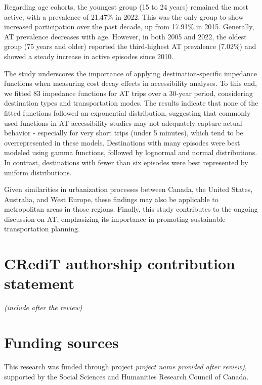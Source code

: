 \documentclass[preprint, 3p,
authoryear]{elsarticle} %
\begin{document}
Regarding age cohorts, the youngest group (15 to 24 years) remained the
most active, with a prevalence of 21.47\% in 2022. This was the only
group to show increased participation over the past decade, up from
17.91\% in 2015. Generally, AT prevalence decreases with age. However,
in both 2005 and 2022, the oldest group (75 years and older) reported
the third-highest AT prevalence (7.02\%) and showed a steady increase in
active episodes since 2010.

The study underscores the importance of applying destination-specific
impedance functions when measuring cost decay effects in accessibility
analyses. To this end, we fitted 83 impedance functions for AT trips
over a 30-year period, considering destination types and transportation
modes. The results indicate that none of the fitted functions followed
an exponential distribution, suggesting that commonly used functions in
AT accessibility studies may not adequately capture actual behavior -
especially for very short trips (under 5 minutes), which tend to be
overrepresented in these models. Destinations with many episodes were
best modeled using gamma functions, followed by lognormal and normal
distributions. In contrast, destinations with fewer than six episodes
were best represented by uniform distributions.

Given similarities in urbanization processes between Canada, the United
States, Australia, and West Europe, these findings may also be
applicable to metropolitan areas in those regions. Finally, this study
contributes to the ongoing discussion on AT, emphasizing its importance
in promoting sustainable transportation planning.

\section*{CRediT authorship contribution
statement}\label{credit-authorship-contribution-statement}

\emph{(include after the review)}

\section*{Funding sources}\label{funding-sources}

This research was funded through project \emph{project name provided
after review)}, supported by the Social Sciences and Humanities Research
Council of Canada.
\end{document}
